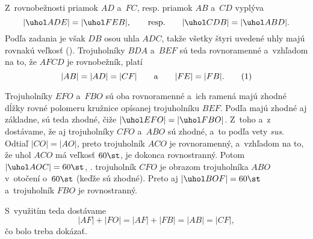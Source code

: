 {%
Z~rovnobežnosti priamok $AD$ a~$FC$, resp. priamok $AB$ a~$CD$ vyplýva
$$
|\uhol ADE|=|\uhol FEB|,\qquad\text{resp.}\qquad |\uhol CDB|=|\uhol ABD|.
$$
Podľa zadania je však $DB$ osou uhla $ADC$, takže všetky štyri uvedené uhly majú rovnakú veľkosť (\obr).
%
Trojuholníky $BDA$ a~$BEF$ sú teda rovnoramenné a~vzhľadom na to, že $AFCD$ je rovnobežník, platí
$$
|AB|=|AD|=|CF|\qquad\text{a}\qquad |FE|=|FB|.
\tag1
$$

Trojuholníky $EFO$ a~$FBO$ sú oba rovnoramenné a~ich ramená majú zhodné dĺžky rovné polomeru kružnice opísanej trojuholníku $BEF$. Podľa  majú zhodné aj základne, sú teda zhodné, čiže $|\uhol EFO|=|\uhol FBO|$. Z~toho a~z~ dostávame, že aj trojuholníky $CFO$ a~$ABO$ sú zhodné, a~to podľa vety {\it sus}. Odtiaľ $|CO|=|AO|$, preto trojuholník $ACO$ je rovnoramenný, a~vzhľadom na to, že uhol $ACO$ má veľkosť $60\st$, je dokonca rovnostranný. Potom $|\uhol AOC|=60\st$, \tj. trojuholník $CFO$ je obrazom trojuholníka $ABO$ v~otočení o~$60\st$ (keďže sú zhodné). Preto aj $|\uhol BOF|=60\st$ a~trojuholník $FBO$ je rovnostranný.

S~využitím  teda dostávame
$$
|AF|+|FO|=|AF|+|FB|=|AB|=|CF|,
$$
čo bolo treba dokázať.
}

